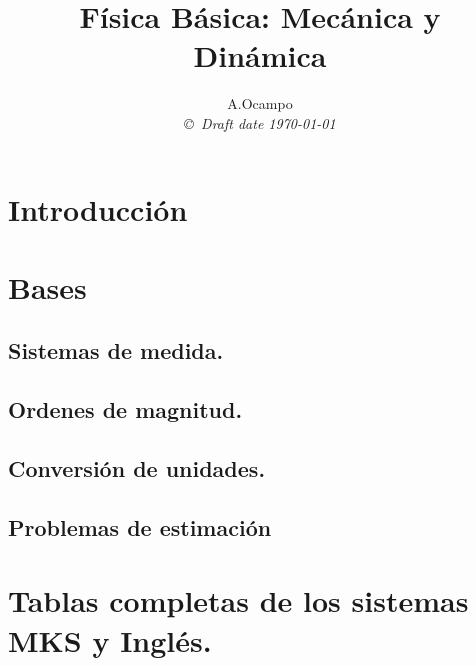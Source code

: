 \documentclass[10pt]{book}
\theoremstyle{definition}
\begin{document}
\title{F\'isica B\'asica: Mec\'anica y Din\'amica }
\author{A.Ocampo  \\
{\small\em \copyright \  Draft date \today }}
\date{ }
\maketitle
{}
\tableofcontents
\listoffigures
\listoftables
\Large
\chapter{Introducci\'on}

\chapter{Bases}

\section{Sistemas de medida.}

\section{Ordenes de magnitud.}

\section{Conversi\'on de unidades.}

\section{Problemas de estimaci\'on}

\appendix
\chapter{Tablas completas de los sistemas MKS y Ingl\'es.}



\end{document}
